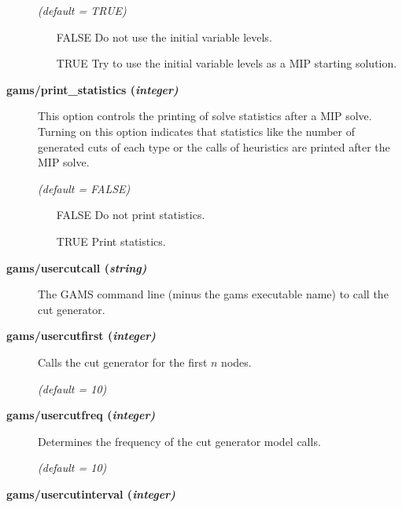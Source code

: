 \begin{description}
\textsl{(default = TRUE)}
\begin{itemize}
\item[FALSE] Do not use the initial variable levels.
\item[TRUE] Try to use the initial variable levels as a MIP starting solution.
\end{itemize}


\item[\label{scipprintstat}\hypertarget{scipprintstat}
{\textbf{gams/print\_statistics (\slshape{integer})}}]\hspace{1.0in}

This option controls the printing of solve statistics after a MIP solve.
Turning on this option indicates that statistics like the number of
generated cuts of each type or the calls of heuristics are printed after the
MIP solve.

\textsl{(default = FALSE)}
\begin{itemize}
\item[FALSE] Do not print statistics.
\item[TRUE] Print statistics.
\end{itemize}


\item[\label{scipusercutcall}\hypertarget{scipusercutcall}
{\textbf{gams/usercutcall (\slshape{string})}}]\hspace{1.0in}

The GAMS command line (minus the gams executable name) to call the cut generator.


\item[\label{scipusercutfirst}\hypertarget{scipusercutfirst}
{\textbf{gams/usercutfirst (\slshape{integer})}}]\hspace{1.0in}

Calls the cut generator for the first $n$ nodes.

\textsl{(default = 10)}

\item[\label{scipusercutfreq}\hypertarget{scipusercutfreq}
{\textbf{gams/usercutfreq (\slshape{integer})}}]\hspace{1.0in}

Determines the frequency of the cut generator model calls.

\textsl{(default = 10)}

\item[\label{scipusercutinterval}\hypertarget{scipusercutinterval}
{\textbf{gams/usercutinterval (\slshape{integer})}}]\hspace{1.0in}


\end{description}
